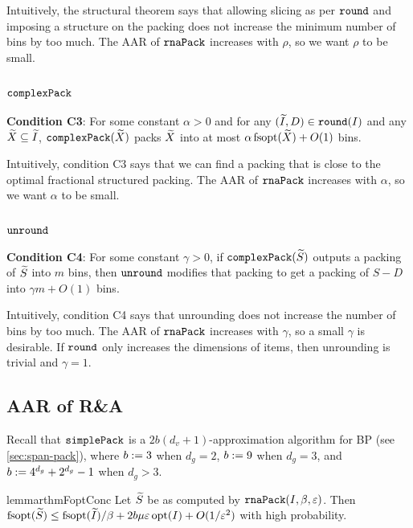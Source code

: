 Intuitively, the structural theorem says that allowing slicing as per $\operatorname{\mathtt{round}}$
and imposing a structure on the packing
does not increase the minimum number of bins by too much.
The AAR of $\operatorname{\mathtt{rnaPack}}$ increases with $\rho$, so we want $\rho$ to be small.

\subsection{\texorpdfstring{$\operatorname{\mathtt{complexPack}}$}{complex-pack}}
\label{sec:rna:complex-pack}

\textbf{Condition C3}:
For some constant $\alpha > 0$ and for any $(\widetilde{I}, D) \in \operatorname{\mathtt{round}}(I)$
and any $\widetilde{X} \subseteq \widetilde{I}$, $\operatorname{\mathtt{complexPack}}(\widetilde{X})$ packs $\widetilde{X}$ into at most
$\alpha\operatorname{fsopt}(\widetilde{X}) + O(1)$ bins.

Intuitively, condition C3 says that we can find a packing that is
close to the optimal fractional structured packing.
The AAR of $\operatorname{\mathtt{rnaPack}}$ increases with $\alpha$, so we want $\alpha$ to be small.

\subsection{\texorpdfstring{$\operatorname{\mathtt{unround}}$}{unround}}
\label{sec:rna:unround}

\textbf{Condition C4}:
For some constant $\gamma > 0$, if $\operatorname{\mathtt{complexPack}}(\widetilde{S})$ outputs a packing
of $\widetilde{S}$ into $m$ bins, then $\operatorname{\mathtt{unround}}$ modifies that packing
to get a packing of $S-D$ into $\gamma m + O(1)$ bins.

Intuitively, condition C4 says that unrounding does not increase the number of bins by too much.
The AAR of $\operatorname{\mathtt{rnaPack}}$ increases with $\gamma$, so a small $\gamma$ is desirable.
If $\operatorname{\mathtt{round}}$ only increases the dimensions of items,
then unrounding is trivial and $\gamma = 1$.

\subsection{AAR of R\&A}
\label{sec:rna:aar}

Recall that $\operatorname{\mathtt{simplePack}}$ is a $2b(d_v+1)$-approximation algorithm for
 BP (see \cref{sec:span-pack}), where
$b := 3$ when $d_g=2$, $b := 9$ when $d_g = 3$,
and $b := 4^{d_g}+2^{d_g}-1$ when $d_g > 3$.

\begin{restatable}{lemma}{rthmFoptConc}
\label{thm:fopt-conc}
Let $\widetilde{S}$ be as computed by $\operatorname{\mathtt{rnaPack}}(I, \beta, \varepsilon)$. Then\\
$\operatorname{fsopt}(\widetilde{S}) \le \operatorname{fsopt}(\widetilde{I})/\beta + 2b\mu\varepsilon\operatorname{opt}(I) + O(1/\varepsilon^2)$
with high probability.
\end{restatable}

